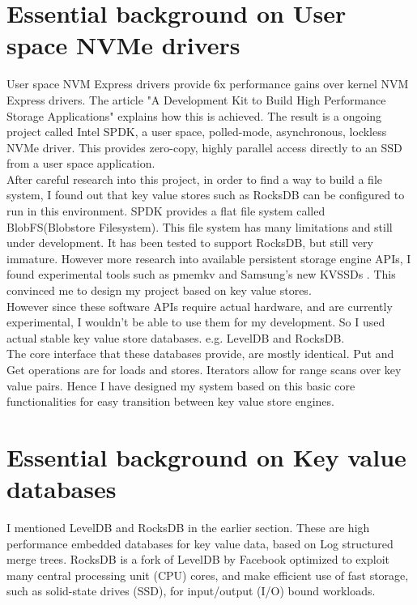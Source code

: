 \documentclass[bsc,frontabs,twoside,singlespacing,parskip,deptreport]{infthesis}     %
\begin{document}
\section{Essential background on User space NVMe drivers}
User space NVM Express drivers provide 6x performance gains over kernel NVM Express drivers. The article "A Development Kit to Build High Performance Storage Applications" \cite{spdk_ieee} explains how this is achieved. The result is a ongoing project called Intel SPDK\cite{spdk}, a user space, polled-mode, asynchronous, lockless NVMe driver. This provides zero-copy, highly parallel access directly to an SSD from a user space application.
\\ After careful research into this project, in order to find a way to build a file system, I found out that key value stores such as RocksDB\cite{rocksdb} can be configured to run in this environment. SPDK provides a flat file system called BlobFS(Blobstore Filesystem). This file system has many limitations and still under development. It has been tested to support RocksDB, but still very immature. However more research into available persistent storage engine APIs, I found experimental tools such as pmemkv\cite{pmemkv} and Samsung's new KVSSDs \cite{samsung_kv_ssd}. This convinced me to design my project based on key value stores. 
\\
However since these software APIs require actual hardware, and are currently experimental, I wouldn't be able to use them for my development. So I used actual stable key value store databases. e.g. LevelDB and RocksDB.
\\
The core interface that these databases provide, are mostly identical. Put and Get operations are for loads and stores. Iterators allow for range scans over key value pairs. Hence I have designed my system based on this basic core functionalities for easy transition between key value store engines.

\section{Essential background on Key value databases}
I mentioned LevelDB\cite{leveldb} and RocksDB\cite{rocksdb} in the earlier section. These are high performance embedded databases for key value data, based on Log structured merge trees. 
\cite{LSM_Trees}
 RocksDB is a fork of LevelDB by Facebook optimized to exploit many central processing unit (CPU) cores, and make efficient use of fast storage, such as solid-state drives (SSD), for input/output (I/O) bound workloads.
 
\end{document}
